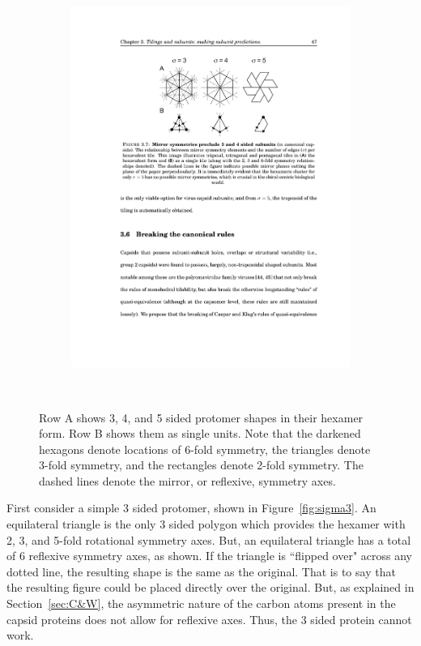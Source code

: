 \documentclass[12pt,letter]{article}
\begin{document}
\begin{figure}[h]
\begin{subfigure}[h]{.2\textwidth}
		\includegraphics[width=\textwidth]{sigma5.pdf}
		\caption{}
		\label{fig:sigma5}
	\end{subfigure}
	\\
	\begin{minipage}[h]{.85\textwidth}
		\begin{footnotesize}
		Row A shows 3, 4, and 5 sided protomer shapes in their hexamer form. Row B shows them as single units. Note that the darkened hexagons denote locations of 6-fold symmetry, the triangles denote 3-fold symmetry, and the rectangles denote 2-fold symmetry. The dashed lines denote the mirror, or reflexive, symmetry axes.
		\end{footnotesize}
	\end{minipage}
	\label{fig:mirror}
\end{figure}

First consider a simple 3 sided protomer, shown in Figure~\ref{fig:sigma3}. An equilateral triangle is the only 3 sided polygon which provides the hexamer with 2, 3, and 5-fold rotational symmetry axes. But, an equilateral triangle has a total of 6 reflexive symmetry axes, as shown. If the triangle is ``flipped over" across any dotted line, the resulting shape is the same as the original. That is to say that the resulting figure could be placed directly over the original. But, as explained in Section~\ref{sec:C&W}, the asymmetric nature of the carbon atoms present in the capsid proteins does not allow for reflexive axes. Thus, the 3 sided protein cannot work.
\end{document}
